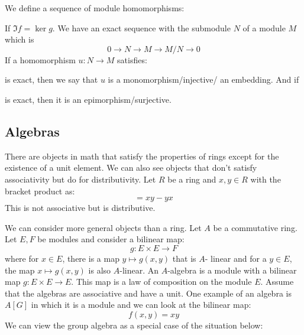 \documentclass{report}
\begin{document}
We define a sequence of module homomorphisms:
    \begin{center}
    \end{center}
If $\Im{f} = \ker{g}$. We have an exact sequence with the submodule $N$ of a module $M$ which is 
    \begin{equation*}
        0 \rightarrow N \rightarrow M \rightarrow M/N \rightarrow 0
    \end{equation*}
If a homomorphism $u : N \rightarrow M$ satisfies:
    \begin{center}
    \end{center}
is exact, then we say that $u$ is a monomorphism/injective/ an embedding. And if 
    \begin{center}
    \end{center}
is exact, then it is an epimorphism/surjective.

\begin{topic}
    \section{Algebras}
\end{topic}

There are objects in math that satisfy the properties of rings except for the existence of a unit element. We can also see objects that don't satisfy associativity but do for distributivity. Let $R$ be a ring and $x, y \in R$ with the bracket product as:
    \begin{equation*}
        [x, y] = xy - yx
    \end{equation*}
This is not associative but is distributive.

We can consider more general objects than a ring. Let $A$ be a commutative ring. Let $E, F$ be modules and consider a bilinear map:
    \begin{equation*}
        g : E \times E \rightarrow F
    \end{equation*}
where for $x \in E$, there is a map $y \mapsto g(x, y)$ that is $A$- linear and for a $y \in E$, the map $x \mapsto g(x, y)$ is also $A$-linear. An $A$-algebra is a module with a bilinear map $g: E \times E \rightarrow E$. This map is a law of composition on the module $E$. Assume that the algebras are associative and have a unit. One example of an algebra is $A[G]$ in which it is a module and we can look at the bilinear map:
    \begin{equation*}
        f(x, y) = xy
    \end{equation*}
We can view the group algebra as a special case of the situation below:
\end{document}
